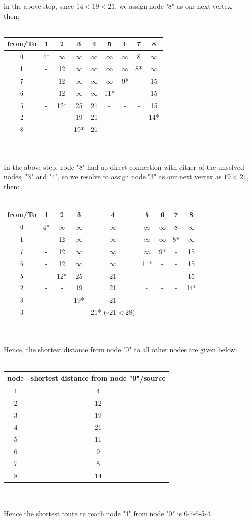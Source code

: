 in the above step, since $ 14 < 19 < 21 $, we assign node "8" as our next vertex, then:\\\\
\begin{tabular}{c | c| c| c| c| c| c| c| c}
	from/To & 1 & 2 & 3 & 4 & 5 & 6 & 7 & 8 \\
	\hline
	0 & 4* & $\infty$ & $\infty$& $\infty$& $\infty$& $\infty$ & 8 & $\infty$\\
	1 & - & 12 & $\infty$& $\infty$& $\infty$& $\infty$ & 8* & $\infty$\\
	7 & - & 12 & $\infty$& $\infty$& $\infty$& 9* & - & 15\\
	6 & - & 12 & $\infty$& $\infty$& 11* & - & - & 15 \\
	5 & - & 12* & 25 & 21 & - & - & - & 15 \\
	2 & - & - & 19 & 21 & - & - & - & 14*\\
	8 & - & - & 19* & 21 & - & - & - & -\\
\end{tabular}\\\\
In the above step, node "8" had no direct connection with either of the unsolved nodes, "3" and "4", so we resolve to assign node "3" as our next vertex as $ 19 < 21 $, then:\\\\
\begin{tabular}{c | c| c| c| c| c| c| c| c}
	from/To & 1 & 2 & 3 & 4 & 5 & 6 & 7 & 8 \\
	\hline
	0 & 4* & $\infty$ & $\infty$& $\infty$& $\infty$& $\infty$ & 8 & $\infty$\\
	1 & - & 12 & $\infty$& $\infty$& $\infty$& $\infty$ & 8* & $\infty$\\
	7 & - & 12 & $\infty$& $\infty$& $\infty$& 9* & - & 15\\
	6 & - & 12 & $\infty$& $\infty$& 11* & - & - & 15 \\
	5 & - & 12* & 25 & 21 & - & - & - & 15 \\
	2 & - & - & 19 & 21 & - & - & - & 14*\\
	8 & - & - & 19* & 21 & - & - & - & -\\
	3 & - & - & - & 21* ($\because 21 < 28$) & - & - & - & -\\
\end{tabular}\\\\
Hence, the shortest distance from node "0" to all other nodes are given below:\\\\
\begin{tabular}{c | c}
	\textbf{node} & \textbf{shortest distance from node "0"/source}\\
	\hline
	1 & 4\\
	2 & 12\\
	3 & 19\\
	4 & 21\\
	5 & 11\\
	6 & 9\\
	7 & 8\\
	8 & 14
\end{tabular}\\\\
Hence the shortest route to reach node "4" from node "0" is 0-7-6-5-4.
%
